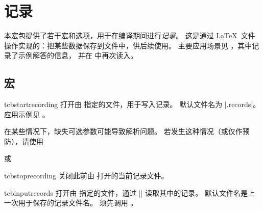 \clearpage
\section{记录}\label{sec:recording}%
%
本宏包提供了若干宏和选项，用于在编译期间进行\emph{记录}。
这是通过 \LaTeX\ 文件操作实现的：把某些数据保存到文件中，供后续使用。
主要应用场景见 ，其中记录了示例解答的信息，
并在  中再次读入。

\subsection{宏}\label{sec:recording-makros}
\begin{docCommand}[doc new=2014-11-28]{tcbstartrecording}{}
  打开由 指定的文件，用于写入记录。
  默认文件名为 |\jobname.records|。
  应用示例见 。
  \begin{marker}
  在某些情况下，缺失可选参数可能导致解析问题。
  若发生这种情况（或仅作预防），请使用
\begin{dispListing}
\tcbstartrecording\relax
\end{dispListing}
  或
\begin{dispListing}
\end{dispListing}
  \end{marker}
\end{docCommand}


\begin{docCommand}[doc new=2014-11-28]{tcbstoprecording}{}
  关闭此前由  打开的当前记录文件。
\end{docCommand}

\begin{docCommand}[doc new=2014-11-28]{tcbinputrecords}{}
  打开由 指定的文件，通过 || 读取其中的记录。
  默认文件名是上一次用于保存的记录文件名。
  须先调用 。
\end{docCommand}


